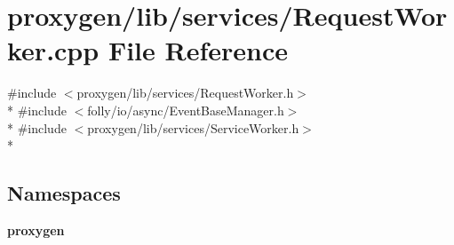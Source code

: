 \section{proxygen/lib/services/\+Request\+Worker.cpp File Reference}
\label{RequestWorker_8cpp}
{\ttfamily \#include $<$proxygen/lib/services/\+Request\+Worker.\+h$>$}\\*
{\ttfamily \#include $<$folly/io/async/\+Event\+Base\+Manager.\+h$>$}\\*
{\ttfamily \#include $<$proxygen/lib/services/\+Service\+Worker.\+h$>$}\\*
\subsection*{Namespaces}
\begin{DoxyCompactItemize}
\item 
 {\bf proxygen}
\end{DoxyCompactItemize}
